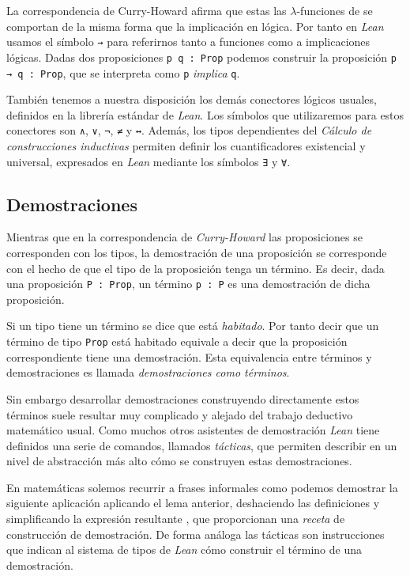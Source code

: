 La correspondencia de Curry-Howard afirma que estas las $\lambda$-funciones de
se comportan de la misma forma que la implicación en lógica.
Por tanto en \textit{Lean} usamos el símbolo \lstinline{→} para referirnos tanto a
funciones como a implicaciones lógicas. Dadas dos
proposiciones \lstinline{p q : Prop} podemos construir la proposición
\lstinline{p → q : Prop}, que se interpreta como \lstinline{p} \textit{implica}
\lstinline{q}.


También tenemos a nuestra disposición los demás conectores lógicos usuales,
definidos en la librería estándar de \textit{Lean}. Los símbolos que
utilizaremos para estos conectores son \lstinline{∧}, \lstinline{∨},
\lstinline{¬}, \lstinline{≠} y \lstinline{↔}. Además, los tipos dependientes del
\textit{Cálculo de construcciones inductivas} permiten definir los
cuantificadores existencial y universal, expresados en \textit{Lean} mediante
los símbolos \lstinline{∃} y \lstinline{∀}.

\subsection{Demostraciones}

Mientras que en la correspondencia de \textit{Curry-Howard} las proposiciones se
corresponden con los tipos, la demostración de una proposición se corresponde
con el hecho de que el tipo de la proposición tenga un término. Es decir, dada
una proposición \lstinline{P : Prop}, un término \lstinline{p : P} es una
demostración de dicha proposición.

Si un tipo tiene un término se dice que está \textit{habitado}. Por tanto decir
que un término de tipo \lstinline{Prop} está habitado equivale a decir que la
proposición correspondiente tiene una demostración. Esta equivalencia entre
términos y demostraciones es llamada \textit{demostraciones como términos}.

Sin embargo desarrollar demostraciones construyendo directamente estos términos
suele resultar muy complicado y alejado del trabajo deductivo matemático usual.
Como muchos otros asistentes de demostración \textit{Lean} tiene definidos una
serie de comandos, llamados \textit{tácticas}, que permiten describir en un
nivel de abstracción más alto cómo se construyen estas demostraciones.

En matemáticas solemos recurrir a frases informales como \guillemotleft
podemos demostrar la siguiente aplicación aplicando el lema anterior,
deshaciendo las definiciones y simplificando la expresión resultante
\guillemotright, que proporcionan una \textit{receta} de construcción de
demostración. De forma análoga las tácticas son instrucciones que indican al
sistema de tipos de \textit{Lean} cómo construir el término de una demostración.

